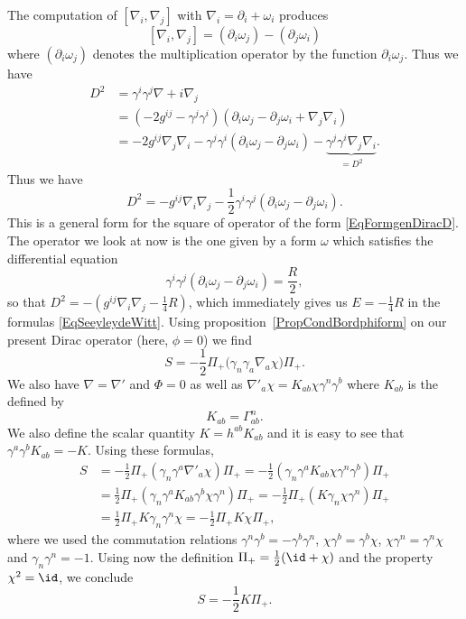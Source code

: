The computation of $[\nabla_i,\nabla_j]$ with $\nabla_i=\partial_i+\omega_i$ produces
\[
  [\nabla_i,\nabla_j]=(\partial_i\omega_j)-(\partial_j\omega_i)
\]
where $(\partial_i\omega_j)$ denotes the multiplication operator by the function $\partial_i\omega_j$. Thus we have
\begin{equation}
\begin{split}
D^2	&=\gamma^i\gamma^j\nabla+i\nabla_j\\
	&=(-2g^{ij}-\gamma^j\gamma^i)(\partial_i\omega_j-\partial_j\omega_i+\nabla_j\nabla_i)\\
	&=-2g^{ij}\nabla_j\nabla_i-\gamma^j\gamma^i(\partial_i\omega_j-\partial_j\omega_i)-\underbrace{\gamma^j\gamma^i\nabla_j\nabla_i}_{=D^2}.
\end{split}
\end{equation}
Thus we have
\begin{equation}
D^2=-g^{ij}\nabla_i\nabla_j-\frac{ 1 }{2}\gamma^i\gamma^j(\partial_i\omega_j-\partial_j\omega_i).
\end{equation}
This is a general form for the square of operator of the form \eqref{EqFormgenDiracD}. The operator we look at now is the one given by a form $\omega$ which satisfies the differential equation
\begin{equation}
\gamma^i\gamma^j(\partial_i\omega_j-\partial_j\omega_i)=\frac{ R }{ 2 },
\end{equation}
so that $D^2=-(g^{ij}\nabla_i\nabla_j-\frac{1}{ 4 }R)$, which immediately gives us $E=-\frac{1}{ 4 }R$ in the formulas \eqref{EqSeeyleydeWitt}. Using proposition~\ref{PropCondBordphiform} on our present Dirac operator (here, $\phi=0$) we find
\begin{equation}
	S=-\frac{1}{ 2 }\Pi_+\big(\gamma_n\gamma_a\nabla_a\chi \big)\Pi_+.
\end{equation}
We also have $\nabla=\nabla'$ and $\Phi=0$ as well as $\nabla'_a\chi=K_{ab}\chi\gamma^n\gamma^b$ where $K_{ab}$ is the  defined by
\[
  K_{ab}=\Gamma^n_{ab}.
\]
We also define the scalar quantity $K=h^{ab}K_{ab}$ and it is easy to see that $\gamma^a\gamma^bK_{ab}=-K$. Using these formulas,
\[
\begin{split}
S	&=-\frac{ 1 }{2}\Pi_+(\gamma_n\gamma^a\nabla'_a\chi)\Pi_+
	=-\frac{ 1 }{2}(\gamma_n\gamma^aK_{ab}\chi\gamma^n\gamma^b)\Pi_+\\
	&=\frac{ 1 }{2}\Pi_+(\gamma_n\gamma^a K_{ab}\gamma^b\chi\gamma^n)\Pi_+
	=-\frac{ 1 }{2}\Pi_+(K\gamma_n\chi\gamma^n)\Pi_+\\
	&=\frac{ 1 }{2}\Pi_+K\gamma_n\gamma^n\chi
	=-\frac{ 1 }{2}\Pi_+K\chi\Pi_+,
\end{split}
\]
where we used the commutation relations $\gamma^n\gamma^b=-\gamma^b\gamma^n$, $\chi\gamma^b=\gamma^b\chi$, $\chi\gamma^n=\gamma^n\chi$ and $\gamma_n\gamma^n=-1$. Using now the definition $\Pi_+=\frac{1}{2}(\id+\chi)$ and the property $\chi^2=\id$, we conclude
\begin{equation}
S	=	-\frac{ 1 }{2}K\Pi_+.
\end{equation}

